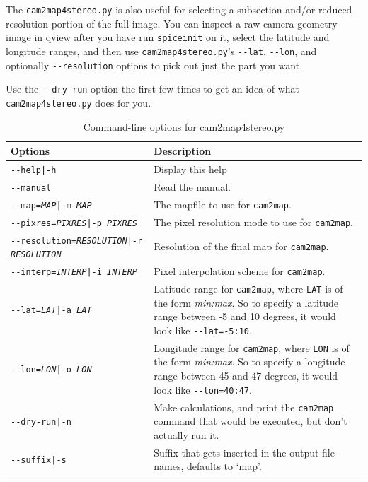The \texttt{cam2map4stereo.py} is also useful for selecting a subsection and/or reduced resolution portion of the full image.  You can inspect a raw camera geometry image in qview after you have run \texttt{spiceinit} on it, select the latitude and longitude ranges, and then use \texttt{cam2map4stereo.py}'s \texttt{-\/-lat}, \texttt{-\/-lon}, and optionally \texttt{-\/-resolution} options to pick out just the part you want.

Use the \texttt{-\/-dry-run} option the first few times to get an idea of what \texttt{cam2map4stereo.py} does for you.

\begin{longtable}{|l|p{10cm}|}
\caption{Command-line options for cam2map4stereo.py}
\label{tbl:bundlevis}
\endfirsthead
\endhead
\endfoot
\endlastfoot
\hline
Options & Description \\ \hline \hline
\texttt{-\/-help|-h} & Display this help \\ \hline
\texttt{-\/-manual} & Read the manual. \\ \hline
\texttt{-\/-map=\textit{MAP}|-m \textit{MAP}} & The mapfile to use for \texttt{cam2map}. \\ \hline
\texttt{-\/-pixres=\textit{PIXRES}|-p \textit{PIXRES}} & The pixel resolution mode to use for \texttt{cam2map}. \\ \hline
\texttt{-\/-resolution=\textit{RESOLUTION}|-r \textit{RESOLUTION}} & Resolution of the final map for \texttt{cam2map}. \\ \hline
\texttt{-\/-interp=\textit{INTERP}|-i \textit{INTERP}} & Pixel interpolation scheme for \texttt{cam2map}. \\ \hline
\texttt{-\/-lat=\textit{LAT}|-a \textit{LAT}} & Latitude range for \texttt{cam2map}, where \texttt{LAT} is of the form \textit{min:max}.  So to specify a latitude range between -5 and 10 degrees, it would look like \texttt{-\/-lat=-5:10}. \\ \hline
\texttt{-\/-lon=\textit{LON}|-o \textit{LON}} & Longitude range for \texttt{cam2map}, where \texttt{LON} is of the form \textit{min:max}.  So to specify a longitude range between 45 and 47 degrees, it would look like \texttt{-\/-lon=40:47}. \\ \hline
\texttt{-\/-dry-run|-n} & Make calculations, and print the \texttt{cam2map} command that would be executed, but don't actually run it.\\ \hline
\texttt{-\/-suffix|-s} & Suffix that gets inserted in the output file names, defaults to `map'.\\ \hline
\end{longtable}



